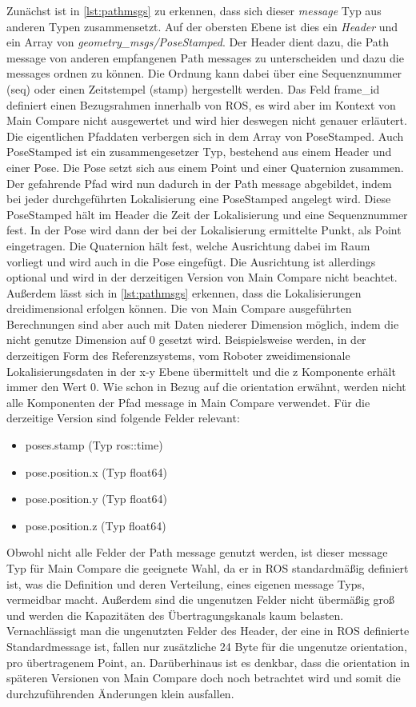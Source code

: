 Zunächst ist in \autoref{lst:pathmsgs} zu erkennen, dass sich dieser \textit{message} Typ aus anderen Typen
zusammensetzt. Auf der obersten Ebene ist dies ein
\textit{Header} und ein Array von \textit{geometry\_msgs/PoseStamped}.
Der Header dient dazu, die Path message von anderen empfangenen
Path messages zu unterscheiden und dazu die messages ordnen zu können. Die Ordnung kann dabei über eine Sequenznummer
(seq) oder einen Zeitstempel (stamp) hergestellt werden. Das Feld frame\_id
definiert einen Bezugsrahmen innerhalb von ROS, es wird aber im Kontext von
Main Compare nicht ausgewertet und wird hier deswegen nicht genauer erläutert.
Die eigentlichen Pfaddaten verbergen sich in dem Array von PoseStamped. Auch
PoseStamped ist ein zusammengesetzer Typ, bestehend aus einem Header und einer
Pose. Die Pose setzt sich aus einem Point und einer Quaternion zusammen.
Der gefahrende Pfad wird nun dadurch in der Path message abgebildet, indem bei
jeder durchgeführten Lokalisierung eine PoseStamped angelegt wird. Diese PoseStamped
hält im Header die Zeit der Lokalisierung und eine Sequenznummer fest. In der
Pose wird dann der bei der Lokalisierung ermittelte Punkt, als Point eingetragen. Die Quaternion
hält fest, welche Ausrichtung dabei im Raum vorliegt und wird auch
in die Pose eingefügt. Die Ausrichtung ist
allerdings optional und wird in der derzeitigen Version von Main Compare nicht beachtet. 
Außerdem lässt sich in \autoref{lst:pathmsgs} erkennen, dass die
Lokalisierungen dreidimensional erfolgen können. Die von Main Compare
ausgeführten Berechnungen sind aber auch mit Daten niederer Dimension möglich,
indem die nicht genutze Dimension auf 0 gesetzt wird. Beispielsweise werden,
in der derzeitigen Form des Referenzsystems, vom Roboter zweidimensionale
Lokalisierungsdaten in der x-y Ebene übermittelt und die z Komponente erhält
immer den Wert 0. Wie schon in Bezug auf die orientation erwähnt, werden nicht alle Komponenten der
Pfad message in Main Compare verwendet. Für die derzeitige Version sind
folgende Felder relevant:

\begin{itemize}
  \item poses.stamp (Typ ros::time)
  \item pose.position.x (Typ float64)
  \item pose.position.y (Typ float64)
  \item pose.position.z (Typ float64)
\end{itemize}

Obwohl nicht alle Felder der Path message genutzt werden, ist dieser message Typ
für Main Compare die geeignete Wahl, da er in ROS standardmäßig
definiert ist, was die Definition und deren Verteilung, eines
eigenen message Typs, vermeidbar macht. Außerdem sind die ungenutzen Felder nicht
übermäßig groß und werden die Kapazitäten des Übertragungskanals kaum belasten.
Vernachlässigt man die ungenutzten Felder des Header, der eine in ROS definierte Standardmessage ist, fallen nur
zusätzliche 24 Byte für die ungenutze orientation, pro übertragenem Point, an.
Darüberhinaus ist es denkbar, dass die orientation in späteren Versionen von
Main Compare doch noch betrachtet wird und somit die durchzuführenden
Änderungen klein ausfallen.

